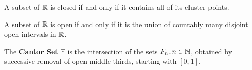 \begin{theorem}
	A subset of $\mathbb{R}$ is closed if and only if it contains all of its cluster points.
\end{theorem}

\begin{theorem}
	A subset of $\mathbb{R}$ is open if and only if it is the union of countably many disjoint open intervals in $\mathbb{R}$.
\end{theorem}

\begin{definition}
	The \textbf{Cantor Set} $\mathbb{F}$ is the intersection of the sets $F_n, n\in\mathbb{N}$, obtained by successive removal of open middle thirds, starting with $[0,1]$.
\end{definition}
